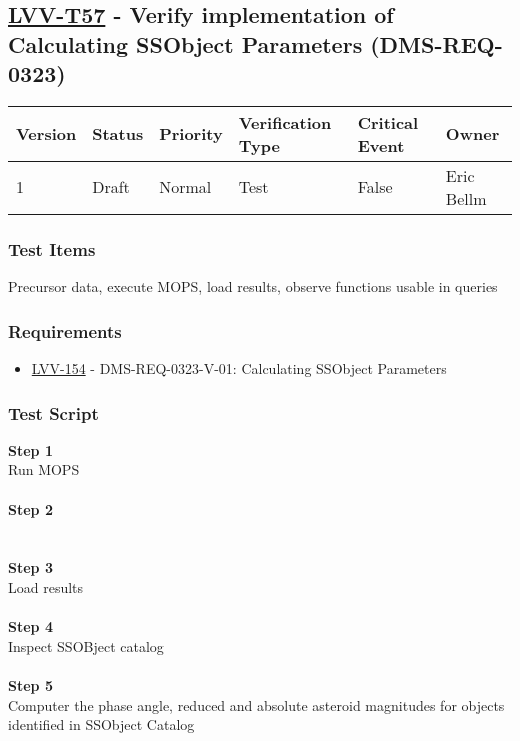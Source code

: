 \hypertarget{lvv-t57---verify-implementation-of-calculating-ssobject-parameters-dms-req-0323}{%
\subsection{\texorpdfstring{\href{https://jira.lsstcorp.org/secure/Tests.jspa\#/testCase/LVV-T57}{LVV-T57}
- Verify implementation of Calculating SSObject Parameters
(DMS-REQ-0323)}{LVV-T57 - Verify implementation of Calculating SSObject Parameters (DMS-REQ-0323)}}\label{lvv-t57---verify-implementation-of-calculating-ssobject-parameters-dms-req-0323}}

\begin{longtable}[]{@{}llllll@{}}
\toprule
Version & Status & Priority & Verification Type & Critical Event &
Owner\tabularnewline
\midrule
\endhead
1 & Draft & Normal & Test & False & Eric Bellm\tabularnewline
\bottomrule
\end{longtable}

\hypertarget{test-items-146}{%
\subsubsection{Test Items}\label{test-items-146}}

Precursor data, execute MOPS, load results, observe functions usable in
queries

\hypertarget{requirements-147}{%
\subsubsection{Requirements}\label{requirements-147}}

\begin{itemize}
\tightlist
\item
  \href{https://jira.lsstcorp.org/browse/LVV-154}{LVV-154} -
  DMS-REQ-0323-V-01: Calculating SSObject Parameters
\end{itemize}

\hypertarget{test-script-147}{%
\subsubsection{Test Script}\label{test-script-147}}

\textbf{Step 1}\\
Run MOPS\\
~\\
\textbf{Step 2}\\
~\\
~\\
\textbf{Step 3}\\
Load results\\
~\\
\textbf{Step 4}\\
Inspect SSOBject catalog\\
~\\
\textbf{Step 5}\\
Computer the phase angle, reduced and absolute asteroid magnitudes for
objects identified in SSObject Catalog\\
~\\

